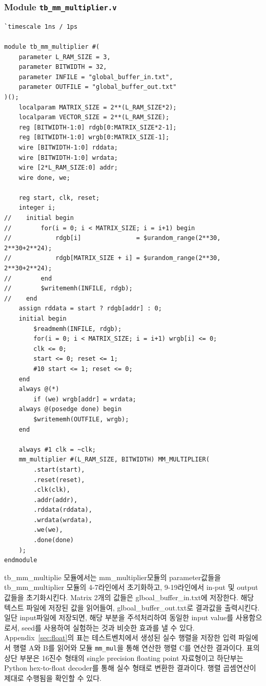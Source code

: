 \documentclass{article}
\begin{document}
\subsubsection*{Module \texttt{tb\_mm\_multiplier.v}}
\begin{lstlisting}[style={verilog-style}]
`timescale 1ns / 1ps

module tb_mm_multiplier #(
    parameter L_RAM_SIZE = 3,
    parameter BITWIDTH = 32,
    parameter INFILE = "global_buffer_in.txt",
    parameter OUTFILE = "global_buffer_out.txt"
)();
    localparam MATRIX_SIZE = 2**(L_RAM_SIZE*2);
    localparam VECTOR_SIZE = 2**(L_RAM_SIZE);
    reg [BITWIDTH-1:0] rdgb[0:MATRIX_SIZE*2-1];
    reg [BITWIDTH-1:0] wrgb[0:MATRIX_SIZE-1];
    wire [BITWIDTH-1:0] rddata;
    wire [BITWIDTH-1:0] wrdata;
    wire [2*L_RAM_SIZE:0] addr;
    wire done, we;
    
    reg start, clk, reset;
    integer i;
//    initial begin
//        for(i = 0; i < MATRIX_SIZE; i = i+1) begin
//            rdgb[i]               = $urandom_range(2**30, 2**30+2**24);
//            rdgb[MATRIX_SIZE + i] = $urandom_range(2**30, 2**30+2**24);
//        end
//        $writememh(INFILE, rdgb);
//    end
    assign rddata = start ? rdgb[addr] : 0;
    initial begin
        $readmemh(INFILE, rdgb);
        for(i = 0; i < MATRIX_SIZE; i = i+1) wrgb[i] <= 0;
        clk <= 0;
        start <= 0; reset <= 1; 
        #10 start <= 1; reset <= 0;
    end
    always @(*)
        if (we) wrgb[addr] = wrdata;
    always @(posedge done) begin
        $writememh(OUTFILE, wrgb);
    end
    
    always #1 clk = ~clk;
    mm_multiplier #(L_RAM_SIZE, BITWIDTH) MM_MULTIPLIER(
        .start(start),
        .reset(reset),
        .clk(clk),
        .addr(addr),
        .rddata(rddata),
        .wrdata(wrdata),
        .we(we),
        .done(done)
    );
endmodule
\end{lstlisting}
tb\_mm\_multiplie 모듈에서는 mm\_multiplier모듈의 parameter값들을 tb\_mm\_multiplier 모듈의 4-7라인에서 초기화하고, 9-19라인에서 in-put 및 output값들을 초기화시킨다. Matrix 2개의 값들은 glboal\_buffer\_in.txt에 저장한다. 해당 텍스트 파일에 저장된 값을 읽어들여, glboal\_buffer\_out.txt로 결과값을 출력시킨다. 일단 input파일에 저장되면, 해당 부분을 주석처리하여 동일한 input value를 사용함으로서, seed를 사용하여 실험하는 것과 비슷한 효과를 낼 수 있다. \\

Appendix~\ref{sec:float}의 표는 테스트벤치에서 생성된 실수 행렬을 저장한 입력 파일에서 행렬 A와 B를 읽어와 모듈 \texttt{mm\_mul}을 통해 연산한 행렬 C를 연산한 결과이다. 표의 상단 부분은 16진수 형태의 single precision floating point 자료형이고 하단부는 Python hex-to-float decoder를 통해 실수 형태로 변환한 결과이다. 행렬 곱셈연산이 제대로 수행됨을 확인할 수 있다.
\end{document}
